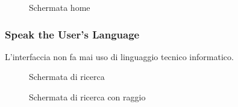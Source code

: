 \begin{figure}[H]
  \caption{Schermata home}
  \label{fig:schermata home}
\end{figure}

\subsubsection{Speak the User's Language}
L'interfaccia non fa mai uso di linguaggio tecnico informatico.

\begin{figure}[h]
  \caption{Schermata di ricerca}
  \label{fig:Schermata di ricerca}
\end{figure}

\begin{figure}[h]
  \caption{Schermata di ricerca con raggio}
  \label{fig:Schermata di ricerca con raggio}
\end{figure}

